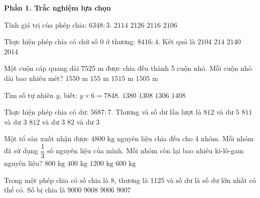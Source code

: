 \textbf{Phần 1. Trắc nghiệm lựa chọn}

\begin{ex} %
Tính giá trị của phép chia: $6348 : 3$.
\choice
{$2114$}
{$2126$}
{\True $2116$}
{$2106$}
\end{ex}

\begin{ex} %
Thực hiện phép chia có chữ số 0 ở thương: $8416 : 4$. Kết quả là
\choice
{\True $2104$}
{$214$}
{$2140$}
{$2014$}
\end{ex}

\begin{ex} %
Một cuộn cáp quang dài $7525\text{ m}$ được chia đều thành 5 cuộn nhỏ. Mỗi cuộn nhỏ dài bao nhiêu mét?
\choice
{$1550\text{ m}$}
{$155\text{ m}$}
{$1515\text{ m}$}
{\True $1505\text{ m}$}
\end{ex}

\begin{ex} %
Tìm số tự nhiên $y$, biết: $y \times 6 = 7848$.
\choice
{$1380$}
{\True $1308$}
{$1306$}
{$1408$}
\end{ex}

\begin{ex} %
Thực hiện phép chia có dư: $5687 : 7$. Thương và số dư lần lượt là
\choice
{$812$ và dư $5$}
{$811$ và dư $3$}
{\True $812$ và dư $3$}
{$82$ và dư $3$}
\end{ex}

\begin{ex} %
Một tổ sản xuất nhận được $4800\text{ kg}$ nguyên liệu chia đều cho 4 nhóm. Mỗi nhóm đã sử dụng $\dfrac{1}{3}$ số nguyên liệu của mình. Mỗi nhóm còn lại bao nhiêu ki-lô-gam nguyên liệu?
\choice
{\True $800\text{ kg}$}
{$400\text{ kg}$}
{$1200\text{ kg}$}
{$600\text{ kg}$}
\end{ex}

\begin{ex} %
Trong một phép chia có số chia là 8, thương là 1125 và số dư là số dư lớn nhất có thể có. Số bị chia là
\choice
{$9000$}
{$9008$}
{$9006$}
{\True $9007$}
\end{ex}

